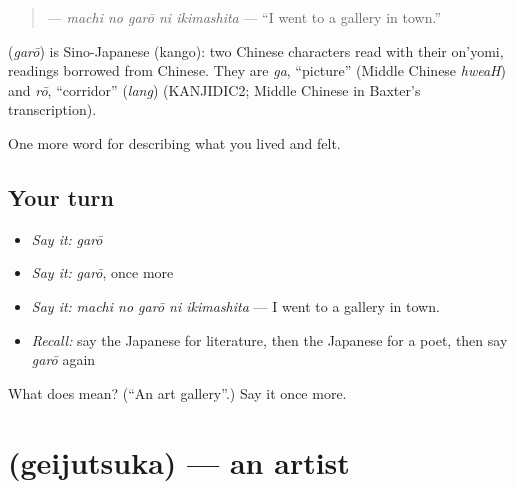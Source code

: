 \begin{quote}
\textbf{  } — \emph{machi no garō ni ikimashita} — \textquotedblleft{}I went to a gallery in town.\textquotedblright{}
\end{quote}

\begin{cousinweb}
\textbf{} (\emph{garō}) is Sino-Japanese (kango): two Chinese characters read with their on'yomi, readings borrowed from Chinese. They are \emph{ga}, \textquotedblleft{}picture\textquotedblright{} (Middle Chinese \emph{hweaH}) and \emph{rō}, \textquotedblleft{}corridor\textquotedblright{} (\emph{lang}) (KANJIDIC2; Middle Chinese in Baxter's transcription).
\end{cousinweb}

\begin{grammarlens}[title={What you've built}]
One more word for describing what you lived and felt.
\end{grammarlens}

\subsection*{Your turn}
\begin{itemize}
\raggedright
  \item \emph{Say it:} \emph{garō}
  \item \emph{Say it:} \emph{garō}, once more
  \item \emph{Say it:} \emph{machi no garō ni ikimashita} — I went to a gallery in town.
  \item \emph{Recall:} say the Japanese for literature, then the Japanese for a poet, then say \emph{garō} again
\end{itemize}

\begin{tcolorbox}[breakable,colback=teal!4,colframe=teal!35!black,title={Before you move on}]
What does  mean? (\textquotedblleft{}An art gallery\textquotedblright{}.) Say it once more.
\end{tcolorbox}
\section[\texorpdfstring{\ja{げいじゅつか} (geijutsuka)}{げいじゅつか (geijutsuka)}]{ (geijutsuka) — an artist}

\label{lesson:JA-C504-geijutsuka}



